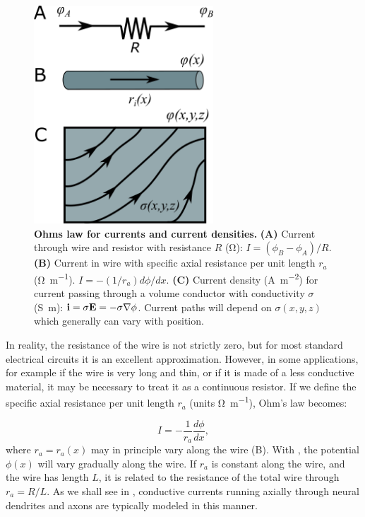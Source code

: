 \begin{figure}[!ht]
\begin{center}
\includegraphics[width=0.6\textwidth]{Figures/Basics/Currents.png}
\end{center}
\caption{{\bf Ohms law for currents and current densities.} {\bf (A)} Current through wire and resistor with resistance $R$ (\si{\ohm}): $I = (\phi_B-\phi_A)/R$. {\bf (B)} Current in wire with specific axial resistance per unit length $r_a$ (\si{\ohm\per\metre}).  $I=- (1/r_a) d\phi/dx$. {\bf (C)} Current density (\si{\ampere\per\square\metre}) for current passing through a volume conductor with conductivity $\sigma$ (\si{\siemens\metre}): ${\bf i} = \sigma {\bf E} = - \sigma {\bf \nabla} \phi$. Current paths will depend on $\sigma(x,y,z)$ which generally can vary with position.}
\label{fig:Basics:Currents}
\end{figure}
In reality, the resistance of the wire is not strictly zero, but for most standard electrical circuits it is an excellent approximation. However, in some applications, for example if the wire is very long and thin, or if it is made of a less conductive material, it may be necessary to treat it as a continuous resistor. If we define the specific axial resistance per unit length $r_{a}$ (units \si{\ohm\per\metre}), Ohm's law becomes:

\begin{equation}
I = - \frac{1}{r_a}\frac{d\phi}{dx},
\label{eq:Basics:Ohm_r}
\end{equation}
where $r_a=r_a(x)$ may in principle vary along the wire (B). With , the potential $\phi(x)$ will vary gradually along the wire. If $r_a$ is constant along the wire, and the wire has length $L$, it is related to the resistance of the total wire through $r_a=R/L$. As we shall see in , conductive currents running axially through neural dendrites and axons are typically modeled in this manner. 


